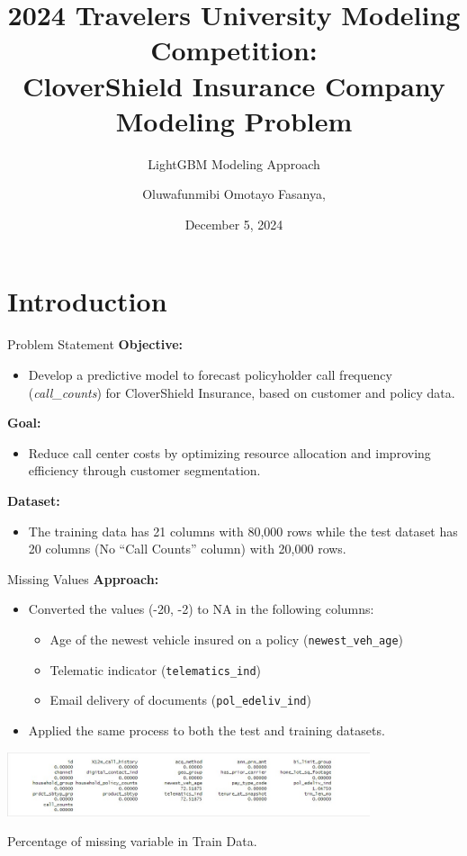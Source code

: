 \documentclass{beamer}\usepackage[]{graphicx}\usepackage[]{xcolor}
\title[Travelers University Modeling Competition]{2024 Travelers University Modeling Competition: \\ CloverShield Insurance Company Modeling Problem}
\subtitle{LightGBM Modeling Approach}
\author[O.F. Fasanya]{Oluwafunmibi Omotayo Fasanya,}
\date{December 5, 2024}
\begin{document}
\frame{\titlepage}

\section{Introduction}

\begin{frame}{Problem Statement}
\textbf{Objective:}
\begin{itemize}
    \item Develop a predictive model to forecast policyholder call frequency (\textit{call\_counts}) for CloverShield Insurance, based on customer and policy data.
\end{itemize}

\textbf{Goal:}
\begin{itemize}
    \item Reduce call center costs by optimizing resource allocation and improving efficiency through customer segmentation.
\end{itemize}

\textbf{Dataset:}
\begin{itemize}
    \item The training data has 21 columns with 80,000 rows while the test dataset has 20 columns (No “Call Counts” column) with 20,000 rows.
\end{itemize}
\end{frame}

\begin{frame}{Missing Values}
\textbf{Approach:}
\begin{itemize}
    \item Converted the values (-20, -2) to NA in the following columns:
    \begin{itemize}
        \item Age of the newest vehicle insured on a policy (\texttt{newest\_veh\_age})
        \item Telematic indicator (\texttt{telematics\_ind})
        \item Email delivery of documents (\texttt{pol\_edeliv\_ind})
    \end{itemize}
    \item Applied the same process to both the test and training datasets.
\end{itemize}

\begin{center}
    \includegraphics[width=0.8\textwidth]{Missing.jpg}
    \vspace{0.2cm} %
    
    \footnotesize{Percentage of missing variable in Train Data.}
\end{center}
\end{frame}
\end{document}
